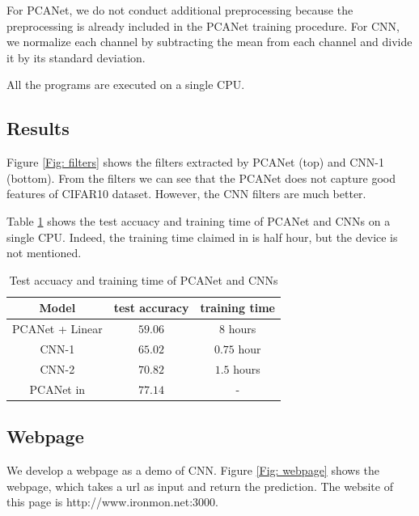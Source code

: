 \documentclass[10pt,twocolumn,letterpaper]{article}
\begin{document}
For PCANet, we do not conduct additional preprocessing because the preprocessing is already included in the PCANet training procedure. For CNN, we normalize each channel by subtracting the mean from each channel and divide it by its standard deviation. 

All the programs are executed on a single CPU.

\subsection{Results}
Figure \ref{Fig: filters} shows the filters extracted by PCANet (top) and CNN-1 (bottom). From the filters we can see that the PCANet does not capture good features of CIFAR10 dataset. However, the CNN filters are much better.

Table \ref{Table: tbl1} shows the test accuacy and training time of PCANet and CNNs on a single CPU. Indeed, the training time claimed in \cite{chan2015pcanet} is half hour, but the device is not mentioned. 

\begin{table}[h]
	\begin{center}
		\begin{tabular}{|c|c|c|}
		\hline
		Model & test accuracy & training time \\
		\hline
		\hline
		PCANet + Linear & $59.06$ & $8$ hours\\
		\hline
		CNN-1 & $65.02$ &$0.75$ hour\\ 	
		\hline
		CNN-2 & $70.82$ & $1.5$ hours\\ 	
		\hline
		PCANet in \cite{chan2015pcanet} & $77.14$ & -\\
			\hline
		\end{tabular}
		\caption{Test accuacy and training time of PCANet and CNNs}
		\label{Table: tbl1}
	\end{center}
\end{table}

\subsection{Webpage}
We develop a webpage as a demo of CNN. Figure \ref{Fig: webpage} shows the webpage, which takes a url as input and return the prediction. The website of this page is http://www.ironmon.net:3000.
\end{document}
